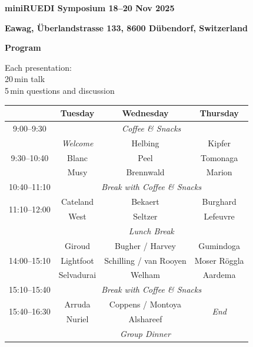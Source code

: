 \documentclass[12pt]{extbook}
\begin{document}
\thispagestyle{empty}
\begin{center}

{\LARGE \bf miniRUEDI Symposium 18--20 Nov 2025}

\bigskip

{\large \bf Eawag, Überlandstrasse 133, 8600 Dübendorf, Switzerland}

\bigskip

{\large \bf Program}

\bigskip

Each presentation:\\[1ex]
20\,min talk\\[0.5ex]
5\,min questions and discussion\\[2ex]

\bigskip



\begin{tabular}{cccc}
\toprule
                              & Tuesday         & Wednesday               & Thursday \\
\midrule
9:00--9:30                    & \multicolumn{3}{c}{\emph{Coffee \& Snacks}}\\
\midrule
\multirow{3}{*}{9:30--10:40}  & \emph{Welcome}  & Helbing                 & Kipfer \\
                              & Blanc           & Peel                    & Tomonaga \\
                              & Musy            & Brennwald               & Marion \\
\midrule
 10:40--11:10                 & \multicolumn{3}{c}{\emph{Break with Coffee \& Snacks}}\\
\midrule
\multirow{2}{*}{11:10--12:00} & Cateland        & Bekaert                 & Burghard \\
                              & West            & Seltzer                 & Lefeuvre \\
\midrule
                              & \multicolumn{3}{c}{\emph{Lunch Break}}\\
\midrule
\multirow{3}{*}{14:00--15:10} & Giroud          & Bugher / Harvey         & Gumindoga \\
                              & Lightfoot       & Schilling / van Rooyen  & Moser Röggla \\
                              & Selvadurai      & Welham                  & Aardema \\
\midrule
15:10--15:40                  & \multicolumn{3}{c}{\emph{Break with Coffee \& Snacks}}\\
\midrule
\multirow{2}{*}{15:40--16:30} & Arruda          & Coppens / Montoya       & \multirow{2}{*}{\emph{End}}\\
                              & Nuriel          & Alshareef \\
\midrule
                              &                 & \emph{Group Dinner} \\
\bottomrule
\end{tabular}

\end{center}
\end{document}
